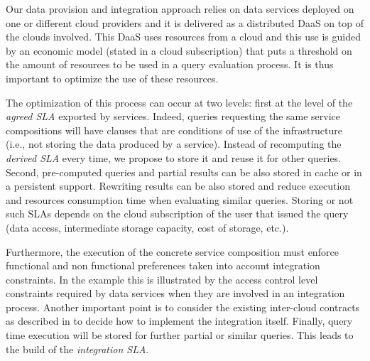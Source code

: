  Our data provision and integration approach relies on data services deployed on one or different cloud providers and it is delivered as a distributed DaaS on top of the clouds involved.  This DaaS  uses resources from a cloud and this use  is  guided by an economic model (stated in a cloud subscription) that puts a threshold on the amount of resources to be used in a query evaluation process. It is thus important to optimize the use of these resources. 
   
The optimization of this process can occur at two levels: first at the level of the {\em agreed SLA} exported by services.  Indeed, queries requesting the same service compositions will have clauses that are  conditions of use of the infrastructure (i.e., not storing the data produced by a service). Instead of recomputing the {\em derived SLA} every time, we propose to store it and reuse it for other queries. 
Second, pre-computed queries and partial results can be also stored in cache or in a persistent support. Rewriting results can be also stored and reduce execution and resources consumption time when evaluating similar queries. Storing or not such SLAs  depends on the cloud subscription of the user that issued the query (data access, intermediate storage capacity, cost of storage, etc.).


Furthermore, the execution of the concrete service composition  must enforce functional and non functional preferences taken into account  integration constraints. In the example this is illustrated by  the access control level constraints required by data services when they are involved in an integration process. Another important point is to consider the existing inter-cloud contracts as described in \cite{} to decide how to implement the integration itself. Finally, query time execution will be stored  for further partial or similar queries.
This leads to the build of the \textit{integration SLA}.




 

%
 
